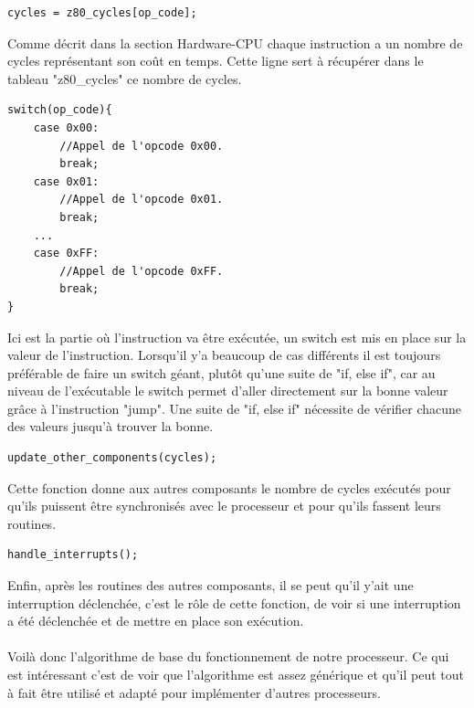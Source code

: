 \documentclass{report}
\begin{document}
\begin{lstlisting}
cycles = z80_cycles[op_code];
\end{lstlisting}
Comme décrit dans la section Hardware-CPU chaque instruction a un nombre de cycles représentant son coût en temps. Cette ligne sert à récupérer dans le tableau "z80\_cycles" ce nombre de cycles.
\begin{lstlisting}
switch(op_code){	
	case 0x00:
		//Appel de l'opcode 0x00.
		break;
	case 0x01:
		//Appel de l'opcode 0x01.
		break;
	...
	case 0xFF:
		//Appel de l'opcode 0xFF.
		break;
}
\end{lstlisting}
Ici est la partie où l'instruction va être exécutée, un switch est mis en place sur la valeur de l'instruction. Lorsqu'il y'a beaucoup de cas différents il est toujours préférable de faire un switch géant, plutôt qu'une suite de "if, else if", car au niveau de l'exécutable le switch permet d'aller directement sur la bonne valeur grâce à l'instruction "jump". Une suite de "if, else if" nécessite de vérifier chacune des valeurs jusqu'à trouver la bonne. 
\begin{lstlisting}
update_other_components(cycles);
\end{lstlisting}
Cette fonction donne aux autres composants le nombre de cycles exécutés pour qu'ils puissent être synchronisés avec le processeur et pour qu'ils fassent leurs routines.
\begin{lstlisting}
handle_interrupts();
\end{lstlisting}
Enfin, après les routines des autres composants, il se peut qu'il y'ait une interruption déclenchée, c'est le rôle de cette fonction, de voir si une interruption a été déclenchée et de mettre en place son exécution.\\\\
Voilà donc l'algorithme de base du fonctionnement de notre processeur. Ce qui est intéressant c'est de voir que l'algorithme est assez générique et qu'il peut tout à fait être utilisé et adapté pour implémenter d'autres processeurs.
\end{document}
